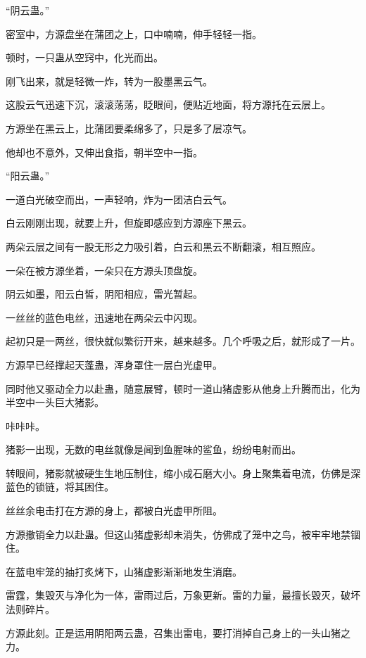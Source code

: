 
\begin{this_body}

“阴云蛊。”

密室中，方源盘坐在蒲团之上，口中喃喃，伸手轻轻一指。

顿时，一只蛊从空窍中，化光而出。

刚飞出来，就是轻微一炸，转为一股墨黑云气。

这股云气迅速下沉，滚滚荡荡，眨眼间，便贴近地面，将方源托在云层上。

方源坐在黑云上，比蒲团要柔绵多了，只是多了层凉气。

他却也不意外，又伸出食指，朝半空中一指。

“阳云蛊。”

一道白光破空而出，一声轻响，炸为一团洁白云气。

白云刚刚出现，就要上升，但旋即感应到方源座下黑云。

两朵云层之间有一股无形之力吸引着，白云和黑云不断翻滚，相互照应。

一朵在被方源坐着，一朵只在方源头顶盘旋。

阴云如墨，阳云白皙，阴阳相应，雷光暂起。

一丝丝的蓝色电丝，迅速地在两朵云中闪现。

起初只是一两丝，很快就似繁衍开来，越来越多。几个呼吸之后，就形成了一片。

方源早已经撑起天蓬蛊，浑身罩住一层白光虚甲。

同时他又驱动全力以赴蛊，随意展臂，顿时一道山猪虚影从他身上升腾而出，化为半空中一头巨大猪影。

咔咔咔。

猪影一出现，无数的电丝就像是闻到鱼腥味的鲨鱼，纷纷电射而出。

转眼间，猪影就被硬生生地压制住，缩小成石磨大小。身上聚集着电流，仿佛是深蓝色的锁链，将其困住。

丝丝余电击打在方源的身上，都被白光虚甲所阻。

方源撤销全力以赴蛊。但这山猪虚影却未消失，仿佛成了笼中之鸟，被牢牢地禁锢住。

在蓝电牢笼的抽打炙烤下，山猪虚影渐渐地发生消磨。

雷霆，集毁灭与净化为一体，雷雨过后，万象更新。雷的力量，最擅长毁灭，破坏法则碎片。

方源此刻。正是运用阴阳两云蛊，召集出雷电，要打消掉自己身上的一头山猪之力。


\end{this_body}
